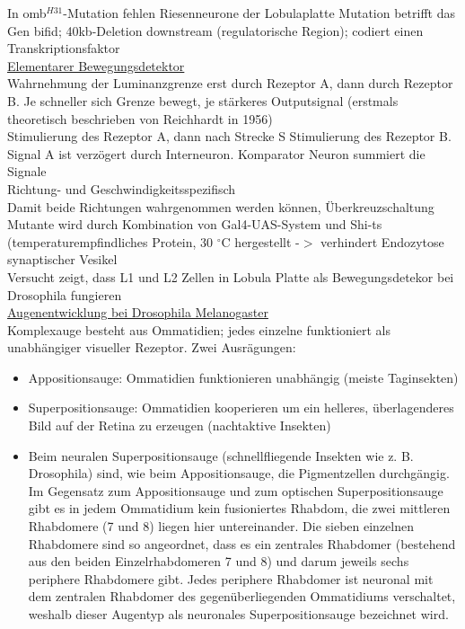\documentclass[12pt,a4paper]{article}
\begin{document}
In omb$^{H31}$-Mutation fehlen Riesenneurone der Lobulaplatte
Mutation betrifft das Gen bifid; 40kb-Deletion downstream (regulatorische Region); codiert einen Transkriptionsfaktor\\

\underline{Elementarer Bewegungsdetektor}\\
Wahrnehmung der Luminanzgrenze erst durch Rezeptor A, dann durch Rezeptor B. Je schneller sich Grenze bewegt, je stärkeres Outputsignal (erstmals theoretisch beschrieben von Reichhardt in 1956)\\
Stimulierung des Rezeptor A, dann nach Strecke S Stimulierung des Rezeptor B. Signal A ist verzögert durch Interneuron. Komparator Neuron summiert die Signale\\
Richtung- und Geschwindigkeitsspezifisch\\
Damit beide Richtungen wahrgenommen werden können, Überkreuzschaltung\\
Mutante wird durch Kombination von Gal4-UAS-System und Shi-ts (temperaturempfindliches Protein, 30 $^\circ$C hergestellt -$>$ verhindert Endozytose synaptischer Vesikel\\
Versucht zeigt, dass L1 und L2 Zellen in Lobula Platte als Bewegungsdetekor bei Drosophila fungieren\\

\underline{Augenentwicklung bei Drosophila Melanogaster}\\
Komplexauge besteht aus Ommatidien; jedes einzelne funktioniert als unabhängiger visueller Rezeptor. Zwei Ausrägungen:
\begin{itemize}
	\item Appositionsauge: Ommatidien funktionieren unabhängig (meiste Taginsekten)
	\item Superpositionsauge: Ommatidien kooperieren um ein helleres, überlagenderes Bild auf der Retina zu erzeugen (nachtaktive Insekten)
	\item Beim neuralen Superpositionsauge (schnellfliegende Insekten wie z. B. Drosophila) sind, wie beim Appositionsauge, die Pigmentzellen durchgängig. Im Gegensatz zum Appositionsauge und zum optischen Superpositionsauge gibt es in jedem Ommatidium kein fusioniertes Rhabdom, die zwei mittleren Rhabdomere (7 und 8) liegen hier untereinander. Die sieben einzelnen Rhabdomere sind so angeordnet, dass es ein zentrales Rhabdomer (bestehend aus den beiden Einzelrhabdomeren 7 und 8) und darum jeweils sechs periphere Rhabdomere gibt. Jedes periphere Rhabdomer ist neuronal mit dem zentralen Rhabdomer des gegenüberliegenden Ommatidiums verschaltet, weshalb dieser Augentyp als neuronales Superpositionsauge bezeichnet wird.
\end{itemize}
\end{document}
